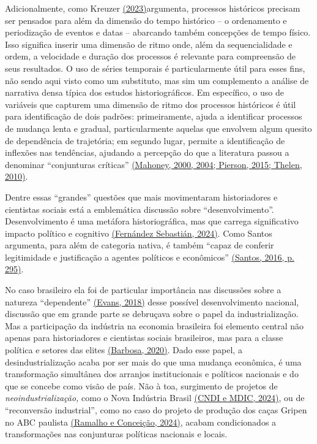 Adicionalmente, como Kreuzer
\href{https://www.zotero.org/google-docs/?Ic6cdI}{(2023)}argumenta,
processos históricos precisam ser pensados para além da dimensão do
tempo histórico -- o ordenamento e periodização de eventos e datas --
abarcando também concepções de tempo físico. Isso significa inserir uma
dimensão de ritmo onde, além da sequencialidade e ordem, a velocidade e
duração dos processos é relevante para compreensão de seus resultados. O
uso de séries temporais é particularmente útil para esses fins, não
sendo aqui visto como um substituto, mas sim um complemento a análise de
narrativa densa típica dos estudos historiográficos. Em específico, o
uso de variáveis que capturem uma dimensão de ritmo dos processos
históricos é útil para identificação de dois padrões: primeiramente,
ajuda a identificar processos de mudança lenta e gradual,
particularmente aquelas que envolvem algum quesito de dependência de
trajetória; em segundo lugar, permite a identificação de inflexões nas
tendências, ajudando a percepção do que a literatura passou a denominar
``conjunturas críticas''
\href{https://www.zotero.org/google-docs/?YTbI1n}{(Mahoney, 2000, 2004;
Pierson, 2015; Thelen, 2010)}.

Dentre essas ``grandes'' questões que mais movimentaram historiadores e
cientistas sociais está a emblemática discussão sobre
``desenvolvimento''. Desenvolvimento é uma metáfora historiográfica, mas
que carrega significativo impacto político e cognitivo
\href{https://www.zotero.org/google-docs/?4FCLf9}{(Fernández Sebastián,
2024)}. Como Santos argumenta, para além de categoria nativa, é também
``capaz de conferir legitimidade e justificação a agentes políticos e
econômicos'' \href{https://www.zotero.org/google-docs/?tkmOPq}{(Santos,
2016, p. 295)}.

No caso brasileiro ela foi de particular importância nas discussões
sobre a natureza ``dependente''
\href{https://www.zotero.org/google-docs/?GvmQDz}{(Evans, 2018)} desse
possível desenvolvimento nacional, discussão que em grande parte se
debruçava sobre o papel da industrialização. Mas a participação da
indústria na economia brasileira foi elemento central não apenas para
historiadores e cientistas sociais brasileiros, mas para a classe
política e setores das elites
\href{https://www.zotero.org/google-docs/?JiVg8Y}{(Barbosa, 2020)}. Dado
esse papel, a desindustrialização acaba por ser mais do que uma mudança
econômica, é uma transformação simultânea dos arranjos institucionais e
políticos nacionais e do que se concebe como visão de país. Não à toa,
surgimento de projetos de \emph{neoindustrialização,} como o Nova
Indústria Brasil \href{https://www.zotero.org/google-docs/?ZxpRYL}{(CNDI
e MDIC, 2024)}, ou de ``reconversão industrial'', como no caso do
projeto de produção dos caças Gripen no ABC paulista
\href{https://www.zotero.org/google-docs/?t3Oo3o}{(Ramalho e Conceição,
2024)}, acabam condicionados a transformações nas conjunturas políticas
nacionais e locais.

